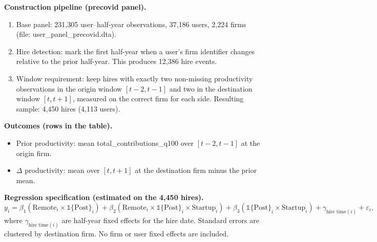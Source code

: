 \documentclass{article}
\begin{document}
\thispagestyle{empty}

\noindent\textbf{Construction pipeline (precovid panel).}
\begin{enumerate}
  \item Base panel: 231{,}305 user--half-year observations, 37{,}186 users, 2{,}224 firms (file: user\_panel\_precovid.dta).
  \item Hire detection: mark the first half-year when a user’s firm identifier changes relative to the prior half-year. This produces 12{,}386 hire events.
  \item Window requirement: keep hires with exactly two non-missing productivity observations in the origin window \([t-2,t-1]\) and two in the destination window \([t,t+1]\), measured on the correct firm for each side. Resulting sample: 4{,}450 hires (4{,}113 users).
\end{enumerate}

\noindent\textbf{Outcomes (rows in the table).}
\begin{itemize}
  \item Prior productivity: mean total\_contributions\_q100 over \([t-2,t-1]\) at the origin firm.
  \item $\Delta$ productivity: mean over \([t,t+1]\) at the destination firm minus the prior mean.
\end{itemize}

\noindent\textbf{Regression specification (estimated on the 4{,}450 hires).}
\[
y_i = \beta_1(\text{Remote}_i \times \mathds{1}\{\text{Post}\}_i) + \beta_2(\text{Remote}_i \times \mathds{1}\{\text{Post}\}_i \times \text{Startup}_i) + \beta_3(\mathds{1}\{\text{Post}\}_i \times \text{Startup}_i) + \gamma_{\text{hire time}(i)} + \varepsilon_i,
\]
where $\gamma_{\text{hire time}(i)}$ are half-year fixed effects for the hire date. Standard errors are clustered by destination firm. No firm or user fixed effects are included.

\begin{table}[h!]
\caption{\textbf{Hire Selection: Prior vs. Post Productivity}}\vspace{0.5em}

\end{table}
\end{document}
